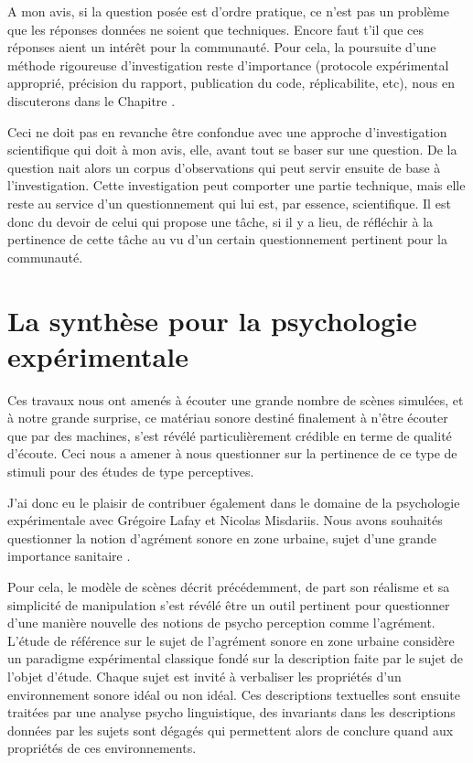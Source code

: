   A mon avis, si la question posée est d'ordre pratique, ce n'est pas un problème que les réponses données ne soient que techniques. Encore faut t'il que ces réponses aient un intérêt pour la communauté. Pour cela, la poursuite d'une méthode rigoureuse d'investigation reste d'importance (protocole expérimental approprié, précision du rapport, publication du code, réplicabilite, etc), nous en discuterons dans le Chapitre \nameref{}.

  Ceci ne doit pas en revanche être confondue avec une approche d'investigation scientifique qui doit à mon avis, elle, avant tout se baser sur une question. De la question nait alors un corpus d'observations qui peut servir ensuite de base à l'investigation. Cette investigation peut comporter une partie technique, mais elle reste au service d'un questionnement qui lui est, par essence, scientifique. Il est donc du devoir de celui qui propose une tâche, si il y a lieu, de réfléchir à la pertinence de cette tâche au vu d'un certain questionnement pertinent pour la communauté.


  \section{ \nmu La  synthèse pour la psychologie expérimentale} \label{sec:psycho}

  Ces travaux nous ont amenés à écouter une grande nombre de scènes simulées, et à notre grande surprise, ce matériau sonore destiné finalement à n'être écouter que par des machines, s'est révélé particulièrement crédible en terme de qualité d'écoute. Ceci nous a amener à nous questionner sur la pertinence de ce type de stimuli pour des études de type perceptives.

  J'ai donc eu le plaisir de contribuer également dans le domaine de la psychologie expérimentale avec Grégoire Lafay et Nicolas Misdariis. Nous avons souhaités questionner la notion d'agrément sonore en zone urbaine, sujet d'une grande importance sanitaire \cite{europe}.

  Pour cela, le modèle de scènes décrit précédemment, de part son réalisme et sa simplicité de manipulation s'est révélé être un outil pertinent pour questionner d'une manière nouvelle des notions de psycho perception comme l'agrément. L'étude de référence sur le sujet de l'agrément sonore en zone urbaine \cite{guastavino} considère un paradigme expérimental classique fondé sur la description faite par le sujet de l'objet d'étude. Chaque sujet est invité à verbaliser les propriétés d'un environnement sonore idéal ou non idéal. Ces descriptions textuelles sont ensuite traitées par une analyse psycho linguistique, des invariants dans les descriptions données par les sujets sont dégagés qui permettent alors de conclure quand aux propriétés de ces environnements.

